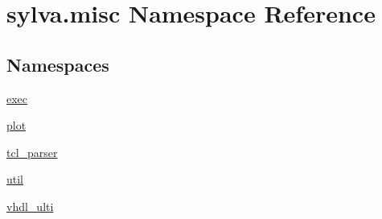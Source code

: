 \hypertarget{namespacesylva_1_1misc}{}\section{sylva.\+misc Namespace Reference}
\label{namespacesylva_1_1misc}
\subsection*{Namespaces}
\begin{DoxyCompactItemize}
\item 
 \hyperlink{namespacesylva_1_1misc_1_1exec}{exec}
\item 
 \hyperlink{namespacesylva_1_1misc_1_1plot}{plot}
\item 
 \hyperlink{namespacesylva_1_1misc_1_1tcl__parser}{tcl\+\_\+parser}
\item 
 \hyperlink{namespacesylva_1_1misc_1_1util}{util}
\item 
 \hyperlink{namespacesylva_1_1misc_1_1vhdl__ulti}{vhdl\+\_\+ulti}
\end{DoxyCompactItemize}
